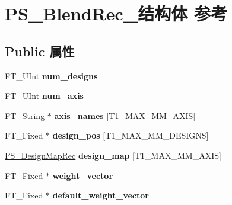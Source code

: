 \hypertarget{struct_p_s___blend_rec__}{}\section{P\+S\+\_\+\+Blend\+Rec\+\_\+结构体 参考}
\label{struct_p_s___blend_rec__}
\subsection*{Public 属性}
\begin{DoxyCompactItemize}
\item 
\mbox{\label{struct_p_s___blend_rec___ad81cbf3697f89908e9c15071e2ab9cac}} 
F\+T\+\_\+\+U\+Int {\bfseries num\+\_\+designs}
\item 
\mbox{\label{struct_p_s___blend_rec___af9b375493ee2d450cabbc571473e4006}} 
F\+T\+\_\+\+U\+Int {\bfseries num\+\_\+axis}
\item 
\mbox{\label{struct_p_s___blend_rec___afc0e4018ff3439f306d61e3c219b91f9}} 
F\+T\+\_\+\+String $\ast$ {\bfseries axis\+\_\+names} \mbox{[}T1\+\_\+\+M\+A\+X\+\_\+\+M\+M\+\_\+\+A\+X\+IS\mbox{]}
\item 
\mbox{\label{struct_p_s___blend_rec___ad0e6c9b9d42346fd8a3371a5b2473e3c}} 
F\+T\+\_\+\+Fixed $\ast$ {\bfseries design\+\_\+pos} \mbox{[}T1\+\_\+\+M\+A\+X\+\_\+\+M\+M\+\_\+\+D\+E\+S\+I\+G\+NS\mbox{]}
\item 
\mbox{\label{struct_p_s___blend_rec___a005c783c65e5dd35611e88901b5db2ca}} 
\hyperlink{struct_p_s___design_map__}{P\+S\+\_\+\+Design\+Map\+Rec} {\bfseries design\+\_\+map} \mbox{[}T1\+\_\+\+M\+A\+X\+\_\+\+M\+M\+\_\+\+A\+X\+IS\mbox{]}
\item 
\mbox{\label{struct_p_s___blend_rec___ae3dcbb2aaee676fdc3d5bde890b2cc78}} 
F\+T\+\_\+\+Fixed $\ast$ {\bfseries weight\+\_\+vector}
\item 
\mbox{\label{struct_p_s___blend_rec___a29c19d988e8ee1eb4f333b1ac55759de}} 
F\+T\+\_\+\+Fixed $\ast$ {\bfseries default\+\_\+weight\+\_\+vector}
\item 

\end{DoxyCompactItemize}
